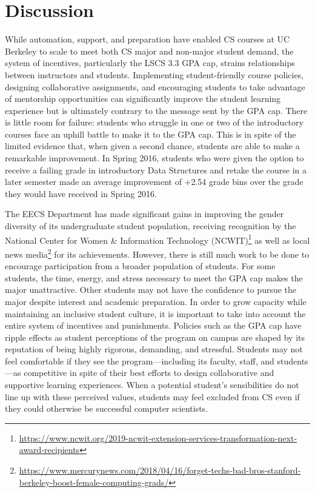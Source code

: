 \chapter{Discussion}
\label{chapter:discussion}

While automation, support, and preparation have enabled CS courses at UC Berkeley to scale to meet both CS major and non-major student demand, the system of incentives, particularly the LSCS 3.3 GPA cap, strains relationships between instructors and students. Implementing student-friendly course policies, designing collaborative assignments, and encouraging students to take advantage of mentorship opportunities can significantly improve the student learning experience but is ultimately contrary to the message sent by the GPA cap. There is little room for failure: students who struggle in one or two of the introductory courses face an uphill battle to make it to the GPA cap. This is in spite of the limited evidence that, when given a second chance, students are able to make a remarkable improvement. In Spring 2016, students who were given the option to receive a failing grade in introductory Data Structures and retake the course in a later semester made an average improvement of +2.54 grade bins over the grade they would have received in Spring 2016.

The EECS Department has made significant gains in improving the gender diversity of its undergraduate student population, receiving recognition by the National Center for Women \& Information Technology (NCWIT)\footnote{\url{https://www.ncwit.org/2019-ncwit-extension-services-transformation-next-award-recipients}} as well as local news media\footnote{\url{https://www.mercurynews.com/2018/04/16/forget-techs-bad-bros-stanford-berkeley-boost-female-computing-grads/}} for its achievements. However, there is still much work to be done to encourage participation from a broader population of students. For some students, the time, energy, and stress necessary to meet the GPA cap makes the major unattractive. Other students may not have the confidence to pursue the major despite interest and academic preparation. In order to grow capacity while maintaining an inclusive student culture, it is important to take into account the entire system of incentives and punishments. Policies such as the GPA cap have ripple effects as student perceptions of the program on campus are shaped by its reputation of being highly rigorous, demanding, and stressful. Students may not feel comfortable if they see the program---including its faculty, staff, and students---as competitive in spite of their best efforts to design collaborative and supportive learning experiences. When a potential student's sensibilities do not line up with these perceived values, students may feel excluded from CS even if they could otherwise be successful computer scientists.

